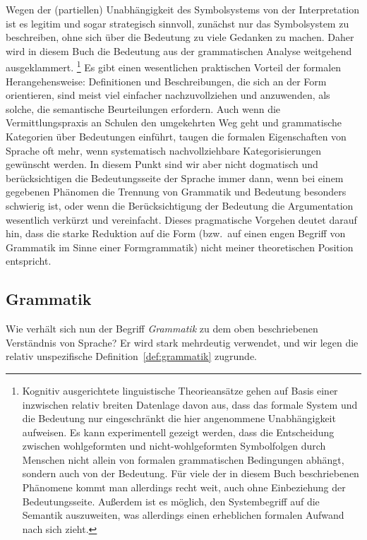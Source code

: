 Wegen der (partiellen) Unabhängigkeit des Symbolsystems von der Interpretation ist es legitim und sogar strategisch sinnvoll, zunächst nur das Symbolsystem zu beschreiben, ohne sich über die Bedeutung zu viele Gedanken zu machen.
Daher wird in diesem Buch die Bedeutung aus der grammatischen Analyse weitgehend ausgeklammert.%
\footnote{Kognitiv ausgerichtete linguistische Theorieansätze gehen auf Basis einer inzwischen relativ breiten Datenlage davon aus, dass das formale System und die Bedeutung nur eingeschränkt die hier angenommene Unabhängigkeit aufweisen.
Es kann \zB experimentell gezeigt werden, dass die Entscheidung zwischen wohlgeformten und nicht-wohlgeformten Symbolfolgen durch Menschen nicht allein von formalen grammatischen Bedingungen abhängt, sondern auch von der Bedeutung.
Für viele der in diesem Buch beschriebenen Phänomene kommt man allerdings recht weit, auch ohne Einbeziehung der Bedeutungsseite.
Außerdem ist es möglich, den Systembegriff auf die Semantik auszuweiten, was allerdings einen erheblichen formalen Aufwand nach sich zieht.}
Es gibt einen wesentlichen praktischen Vorteil der formalen Herangehensweise:
Definitionen und Beschreibungen, die sich an der Form orientieren, sind meist viel einfacher nachzuvollziehen und anzuwenden, als solche, die semantische Beurteilungen erfordern.
Auch wenn die Vermittlungspraxis an Schulen \idR den umgekehrten Weg geht und grammatische Kategorien über Bedeutungen einführt, taugen die formalen Eigenschaften von Sprache oft mehr, wenn systematisch nachvollziehbare Kategorisierungen gewünscht werden.
In diesem Punkt sind wir aber nicht dogmatisch und berücksichtigen die Bedeutungsseite der Sprache immer dann, wenn bei einem gegebenen Phänomen die Trennung von Grammatik und Bedeutung besonders schwierig ist, oder wenn die Berücksichtigung der Bedeutung die Argumentation wesentlich verkürzt und vereinfacht.
Dieses pragmatische Vorgehen deutet darauf hin, dass die starke Reduktion auf die Form (bzw.\ auf einen engen Begriff von Grammatik im Sinne einer Formgrammatik) nicht meiner theoretischen Position entspricht.


\subsection{Grammatik}

\label{sec:grammatikbegriff}

Wie verhält sich nun der Begriff \textit{Grammatik} zu dem oben beschriebenen Verständnis von Sprache?
Er wird stark mehrdeutig verwendet, und wir legen die relativ unspezifische Definition~\ref{def:grammatik} zugrunde.

